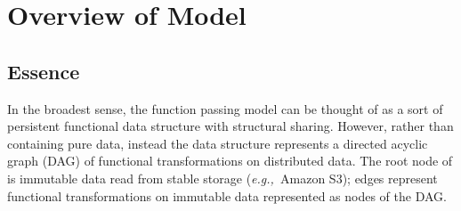 \documentclass[10pt]{sigplanconf}
\theoremstyle{definition}
\theoremstyle{definition}
\newcommand{\eg}{{\em e.g.,~}}
\begin{document}


%
%
%
%
%
%
%

\section{Overview of Model}
\label{sec:basic-model}

\subsection{Essence}

In the broadest sense, the function passing model can be thought of as a sort of
persistent functional data structure with structural sharing. However, rather
than containing pure data, instead the data structure represents a directed
acyclic graph (DAG) of functional transformations on distributed data. The root
node of is immutable data read from stable storage (\eg Amazon S3); edges
represent functional transformations on immutable data represented as nodes of
the DAG.
\end{document}
